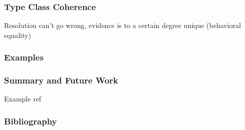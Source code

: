 \documentclass{beamer}
\begin{document}
\begin{frame}
    \frametitle{Type Class Coherence}

    Resolution can't go wrong, evidence is to a certain degree unique (behavioral equality)
\end{frame}

\begin{frame}
    \frametitle{Examples}
\end{frame}

\begin{frame}
    \frametitle{Summary and Future Work}

    Example ref
    \cite{kiselyov}
\end{frame}

\begin{frame}
    \frametitle{Bibliography}
    
    
\end{frame}
\end{document}
